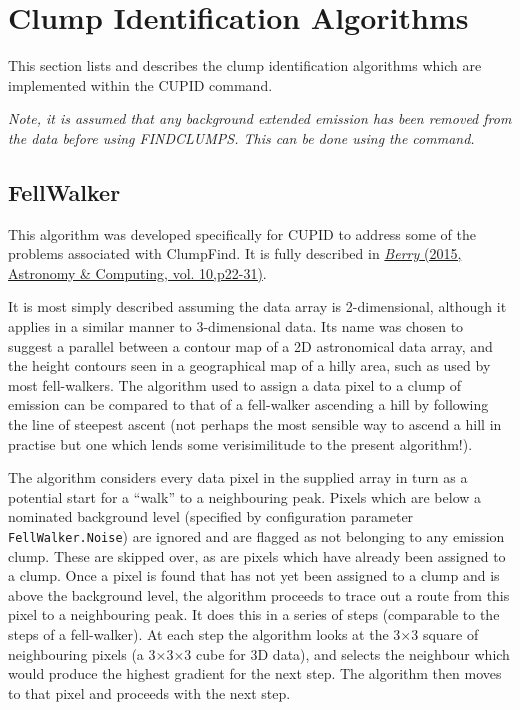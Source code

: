 \documentclass[twoside,11pt]{starlink}
\begin{document}
\section{Clump Identification Algorithms}
This section lists and describes the clump identification algorithms
which are implemented within the CUPID 
command.

\begin{center}
\emph{Note, it is assumed that any background extended emission has
been removed from the data before using FINDCLUMPS. This can be done
using the  command.}
\end{center}

\subsection{FellWalker}
This algorithm was developed specifically for CUPID to address some of
the problems associated with ClumpFind. It is fully described in
\href{http://www.sciencedirect.com/science/article/pii/S2213133714000675}
{\emph{Berry} (2015, Astronomy \& Computing, vol. 10,p22-31)}.

It is most simply described assuming the data array is
2-dimensional, although it applies in a similar manner to 3-dimensional
data. Its name was chosen to suggest a parallel between a contour map of
a 2D astronomical data array, and the height contours seen in a geographical
map of a hilly area, such as used by most fell-walkers. The algorithm
used to assign a data pixel to a clump of emission can be compared to
that of a fell-walker ascending a hill by following the line of steepest
ascent (not perhaps the most sensible way to ascend a hill in practise
but one which lends some verisimilitude to the present algorithm!).

The algorithm considers every data pixel in the supplied array in turn as
a potential start for a ``walk'' to a neighbouring peak. Pixels which are
below a nominated background level (specified by configuration parameter
\texttt{FellWalker.Noise}) are ignored and are flagged as not belonging to any
emission clump. These are skipped over, as are pixels which have already
been assigned to a clump. Once a pixel is found that has not yet been
assigned to a clump and is above the background level, the algorithm
proceeds to trace out a route from this pixel to a neighbouring peak. It
does this in a series of steps (comparable to the steps of a
fell-walker). At each step the algorithm looks at the 3$\times$3 square of
neighbouring pixels (a 3$\times$3$\times$3 cube for 3D data), and selects the
neighbour which would produce the highest gradient for the next step. The
algorithm then moves to that pixel and proceeds with the next step.
\end{document}
